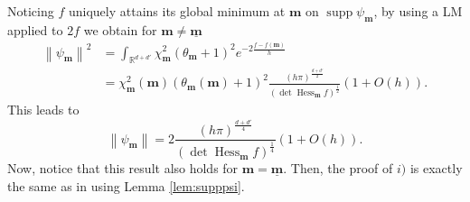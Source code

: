 \documentclass[12pt]{amsart}
\newcommand{\supp}{\operatorname{supp}}
\newcommand{\R}{\mathbb R}
\newcommand{\Hess}{\operatorname{Hess}}
\numberwithin{equation}{section}
\numberwithin{figure}{section}
\def\m{\mathbf{m}}
\def\um{\underline{\m}}
\newcommand{\vvert}[1]{\left\lVert#1\right\rVert}
\begin{document}
Noticing $f$ uniquely attains its global minimum at $\m$ on $\supp\psi_\m$, by using a LM applied to $2f$ we obtain for $\m\neq\um$
\begin{equation*}
\begin{aligned}
    \vvert{\psi_\m}^2 &= \int_{\R^{d+d'}}\chi_\m^2(\theta_\m+1)^2e^{-2\frac{f-f(\m)}{h}}\\
    &= \chi_\m^2(\m)(\theta_\m(\m)+1)^2\frac{(h\pi)^{\frac {d+d'}2}}{(\det\Hess_\m f)^{\frac12}}(1+O(h)).
\end{aligned}
\end{equation*}
This leads to
\begin{equation}\label{eq:eclpsi}
\vvert{\psi_\m} = 2\frac{(h\pi)^{\frac {d+d'}4}}{(\det\Hess_\m f)^{\frac14}}(1+O(h)).
\end{equation}
Now, notice that this result also holds for $\m = \um$. Then, the proof of $i)$ is exactly the same as in \cite{BoLePMi22} using Lemma \ref{lem:supppsi}.
\end{document}
